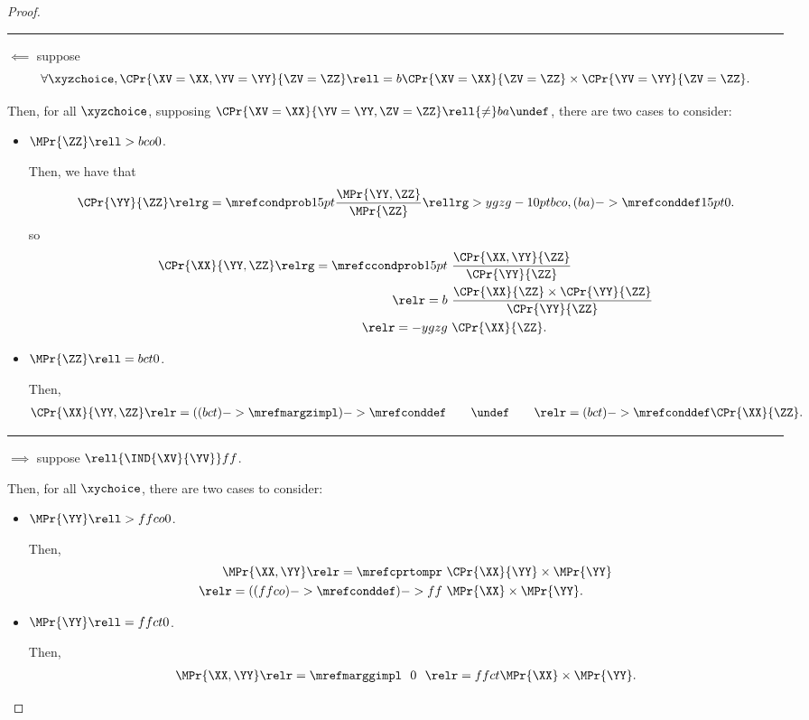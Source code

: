 \begin{proof}
  \hrule
  $\impliedby$ suppose 
  $$\forall \xyzchoice,
  \CPr{\XV = \XX, \YV = \YY}{\ZV = \ZZ} \rell = b 
  \CPr{\XV = \XX}{\ZV = \ZZ}
  \times
  \CPr{\YV = \YY}{\ZV = \ZZ}.$$

  Then, for all $\xyzchoice$, supposing $\CPr{\XV = \XX}{\YV = \YY, \ZV = \ZZ} \rell {\ne} ba \undef$, there are two cases to consider:
  \begin{itemize}
    \item {} $\MPr{\ZZ} \rell > bco 0$.

      Then, we have that
      $$\CPr{\YY}{\ZZ} \relrg = {\mrefcondprob} 15pt \frac{\MPr{ \YY, \ZZ}}{\MPr{\ZZ}} \rellrg > ygzg -10pt {bco,(ba)->\mrefconddef} 15pt 0.$$
      so
      \begin{align*}
        \CPr{\XX}{\YY, \ZZ}
        \relrg = {\mrefccondprob} 15pt \ & 
        \frac{\CPr{\XX, \YY}{\ZZ}}{\CPr{\YY}{\ZZ}}
        \\
        \relr = b \ & \frac{\CPr{\XX}{\ZZ} \times \CPr{\YY}{\ZZ}}{\CPr{\YY}{\ZZ}}\\
        \relr = -ygzg \ & \CPr{\XX}{\ZZ}.
      \end{align*}
    \item {} $\MPr{\ZZ} \rell = bct 0$.

      Then,
      \begin{align*}
        \CPr{\XX}{\YY, \ZZ}
        \relr = {((bct)->\mrefmargzimpl)->\mrefconddef}
        \ \ \ \ 
        \ \ 
        \undef
        \ \ \ \ 
        \ \ 
        \relr = {(bct)->\mrefconddef} \CPr{\XX}{\ZZ}.
      \end{align*}
  \end{itemize}
  \hrule
  \nrp 15
  $\implies$ suppose $\rell {\IND{\XV}{\YV}} ff $.

  Then, for all $\xychoice$, there are two cases to consider:
  \begin{itemize}
    \item \nrp 16 $\MPr{\YY} \rell > ffco 0$.

    Then,
    \begin{align*}
      \MPr{\XX, \YY}
      \relr = {\mrefcprtompr} &\ \CPr{\XX}{\YY} \times \MPr{\YY}\\
      \relr = {((ffco)->\mrefconddef)->ff} &\ \MPr{\XX} \times \MPr{\YY}.
    \end{align*}

    \item \nrp 17 $\MPr{\YY} \rell = ffct 0$.

    Then,
    \begin{align*}
      \MPr{\XX, \YY} \relr = {\mrefmarggimpl} \ \ 0\ \ 
      \relr = ffct \MPr{\XX} \times \MPr{\YY}.
    \end{align*}
  \end{itemize}


\end{proof}
